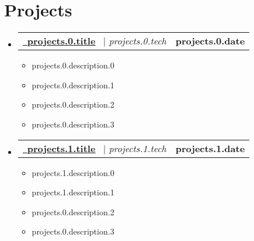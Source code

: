 \documentclass[letterpaper,11pt]{article}
\makeatletter
\newcommand{\resumeItem}[1]{
  \item\small{
    {#1 \vspace{-2pt}}
  }
}
\newcommand{\resumeSubheading}[4]{
  \vspace{-2pt}\item
    \begin{tabular*}{1.0\textwidth}[t]{l@{\extracolsep{\fill}}r}
      \textbf{#1} & \textbf{\small #2} \\
      \textit{\small#3} & \textit{\small #4} \\
    \end{tabular*}\vspace{-7pt}
}
\newcommand{\resumeProjectHeading}[2]{
    \item
    \begin{tabular*}{1.001\textwidth}{l@{\extracolsep{\fill}}r}
      \small#1 & \textbf{\small #2}\\
    \end{tabular*}\vspace{-7pt}
}
\newcommand{\resumeSubHeadingListStart}{\begin{itemize}[leftmargin=0.0in, label={}]}
\newcommand{\resumeSubHeadingListEnd}{\end{itemize}}
\newcommand{\resumeItemListStart}{\begin{itemize}}
\newcommand{\resumeItemListEnd}{\end{itemize}\vspace{-5pt}}
\makeatother
\begin{document}
\vspace{-20pt}

\section{Projects}
    \vspace{-5pt}
    \resumeSubHeadingListStart
    \resumeProjectHeading
          {\href{{{projects.0.link}}}{\raisebox{-0.2\height}\ \underline{\textbf{{{projects.0.title}}}}}~ $|$ \emph{{{projects.0.tech}}}}{{{projects.0.date}}}
          \resumeItemListStart
            \resumeItem{{{projects.0.description.0}}}
            \resumeItem{{{projects.0.description.1}}}
            \resumeItem{{{projects.0.description.2}}}
            \resumeItem{{{projects.0.description.3}}}
          \resumeItemListEnd 
                              \vspace{-19pt}

    \resumeProjectHeading
        {\href{{{projects.1.link}}}{\raisebox{-0.2\height}\ \underline{\textbf{{{projects.1.title}}}}}~ $|$ \emph{{{projects.1.tech}}}}{{{projects.1.date}}}
        \resumeItemListStart
        \resumeItem{{{projects.1.description.0}}}
        \resumeItem{{{projects.1.description.1}}}
        \resumeItem{{{projects.0.description.2}}}
        \resumeItem{{{projects.0.description.3}}}
        \resumeItemListEnd 
                    \vspace{-13pt}


          
      
       
    \resumeSubHeadingListEnd
\vspace{-15pt}


        
\end{document}
